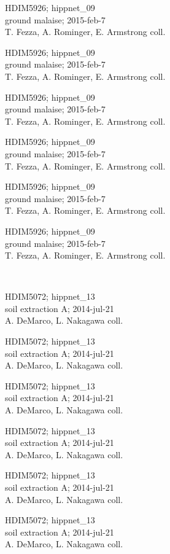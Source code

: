 \documentclass[2pt]{extarticle}
\begin{document}
\noindent
\parbox{0.16\textwidth}{\tiny \raggedright \rule[-0.3\baselineskip]{0pt}{10pt}HDIM5926; hippnet\_09\\ ground malaise; 2015-feb-7\\ T. Fezza, A. Rominger, E. Armstrong coll.}
\parbox{0.16\textwidth}{\tiny \raggedright \rule[-0.3\baselineskip]{0pt}{10pt}HDIM5926; hippnet\_09\\ ground malaise; 2015-feb-7\\ T. Fezza, A. Rominger, E. Armstrong coll.}
\parbox{0.16\textwidth}{\tiny \raggedright \rule[-0.3\baselineskip]{0pt}{10pt}HDIM5926; hippnet\_09\\ ground malaise; 2015-feb-7\\ T. Fezza, A. Rominger, E. Armstrong coll.}
\parbox{0.16\textwidth}{\tiny \raggedright \rule[-0.3\baselineskip]{0pt}{10pt}HDIM5926; hippnet\_09\\ ground malaise; 2015-feb-7\\ T. Fezza, A. Rominger, E. Armstrong coll.}
\parbox{0.16\textwidth}{\tiny \raggedright \rule[-0.3\baselineskip]{0pt}{10pt}HDIM5926; hippnet\_09\\ ground malaise; 2015-feb-7\\ T. Fezza, A. Rominger, E. Armstrong coll.}
\parbox{0.16\textwidth}{\tiny \raggedright \rule[-0.3\baselineskip]{0pt}{10pt}HDIM5926; hippnet\_09\\ ground malaise; 2015-feb-7\\ T. Fezza, A. Rominger, E. Armstrong coll.} \\ 
\vspace{0.001in} 

\noindent
\parbox{0.16\textwidth}{\tiny \raggedright \rule[-0.3\baselineskip]{0pt}{10pt}HDIM5072; hippnet\_13\\ soil extraction A; 2014-jul-21\\ A. DeMarco, L. Nakagawa coll.}
\parbox{0.16\textwidth}{\tiny \raggedright \rule[-0.3\baselineskip]{0pt}{10pt}HDIM5072; hippnet\_13\\ soil extraction A; 2014-jul-21\\ A. DeMarco, L. Nakagawa coll.}
\parbox{0.16\textwidth}{\tiny \raggedright \rule[-0.3\baselineskip]{0pt}{10pt}HDIM5072; hippnet\_13\\ soil extraction A; 2014-jul-21\\ A. DeMarco, L. Nakagawa coll.}
\parbox{0.16\textwidth}{\tiny \raggedright \rule[-0.3\baselineskip]{0pt}{10pt}HDIM5072; hippnet\_13\\ soil extraction A; 2014-jul-21\\ A. DeMarco, L. Nakagawa coll.}
\parbox{0.16\textwidth}{\tiny \raggedright \rule[-0.3\baselineskip]{0pt}{10pt}HDIM5072; hippnet\_13\\ soil extraction A; 2014-jul-21\\ A. DeMarco, L. Nakagawa coll.}
\parbox{0.16\textwidth}{\tiny \raggedright \rule[-0.3\baselineskip]{0pt}{10pt}HDIM5072; hippnet\_13\\ soil extraction A; 2014-jul-21\\ A. DeMarco, L. Nakagawa coll.} \\ 
\vspace{0.001in} 
\end{document}
